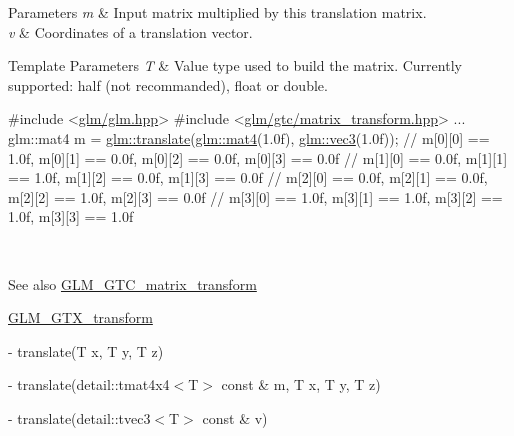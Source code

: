 \begin{DoxyParams}{Parameters}
{\em m} & Input matrix multiplied by this translation matrix. \\
\hline
{\em v} & Coordinates of a translation vector. \\
\hline
\end{DoxyParams}

\begin{DoxyTemplParams}{Template Parameters}
{\em T} & Value type used to build the matrix. Currently supported\+: half (not recommanded), float or double. 
\begin{DoxyCode}
\textcolor{preprocessor}{#include <\hyperlink{glm_8hpp}{glm/glm.hpp}>}
\textcolor{preprocessor}{#include <\hyperlink{matrix__transform_8hpp}{glm/gtc/matrix\_transform.hpp}>}
...
glm::mat4 m = \hyperlink{group__gtc__matrix__transform_ga8925161ecc1767957900c5ca8b922dc4}{glm::translate}(\hyperlink{structglm_1_1detail_1_1tmat4x4}{glm::mat4}(1.0f), \hyperlink{structglm_1_1detail_1_1tvec3}{glm::vec3}(1.0f));
\textcolor{comment}{// m[0][0] == 1.0f, m[0][1] == 0.0f, m[0][2] == 0.0f, m[0][3] == 0.0f}
\textcolor{comment}{// m[1][0] == 0.0f, m[1][1] == 1.0f, m[1][2] == 0.0f, m[1][3] == 0.0f}
\textcolor{comment}{// m[2][0] == 0.0f, m[2][1] == 0.0f, m[2][2] == 1.0f, m[2][3] == 0.0f}
\textcolor{comment}{// m[3][0] == 1.0f, m[3][1] == 1.0f, m[3][2] == 1.0f, m[3][3] == 1.0f}
\end{DoxyCode}
 \\
\hline
\end{DoxyTemplParams}
\begin{DoxySeeAlso}{See also}
\hyperlink{group__gtc__matrix__transform}{G\+L\+M\+\_\+\+G\+T\+C\+\_\+matrix\+\_\+transform} 

\hyperlink{group__gtx__transform}{G\+L\+M\+\_\+\+G\+T\+X\+\_\+transform} 

-\/ translate(\+T x, T y, T z) 

-\/ translate(detail\+::tmat4x4$<$\+T$>$ const \& m, T x, T y, T z) 

-\/ translate(detail\+::tvec3$<$\+T$>$ const \& v) 
\end{DoxySeeAlso}
\hypertarget{group__gtc__matrix__transform_ga42299b3ef778f1d6120032da73b0ef87}{}
